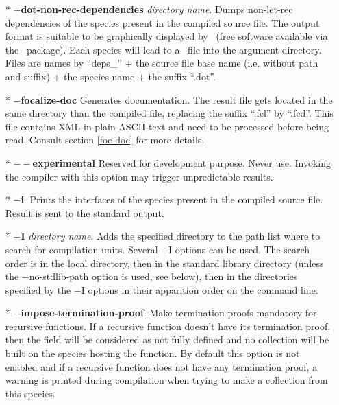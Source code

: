 \begin{itemize}
  \item[*] {\bf $-$dot-non-rec-dependencies} {\em directory name}.
    Dumps non-let-rec dependencies of the species present in the
    compiled source file. The output format is suitable to be
    graphically displayed by \dotty\ (free software available via the
    \graphviz\ package). Each species will lead to a \dotty\ file into
    the argument directory. Files are names by ``deps\_'' + the source
    file base name (i.e. without path and suffix) + the species name +
    the suffix ``.dot''.

  \item[*] {\bf $-$focalize-doc} Generates documentation. The
    result file gets located in the same directory than the compiled
    file, replacing the suffix ``.fcl'' by ``.fcd''. This file contains
    XML in plain ASCII text and need to be processed before being read.
    Consult section \ref{foc-doc} for more details.

  \item[*] {\bf $--$experimental} Reserved for development purpose.
    Never use. Invoking the compiler with this option may trigger
    unpredictable results.

  \item[*] {\bf $-$i}. Prints the interfaces of the species present in
    the compiled source file. Result is sent to the standard output.

  \item[*] {\bf $-$I} {\em directory name}. Adds the specified
    directory to the path list where to search for
    compilation units. Several $-$I options can be used. The search order is
    in the local directory, then in the standard library directory (unless the
    $-$no-stdlib-path option is used, see below), then in the
    directories specified by the $-$I options in their apparition
    order on the command line.

  \item[*] {\bf $-$impose-termination-proof}. Make termination proofs
    mandatory for recursive functions. If a recursive function doesn't
    have its termination proof, then the field will be considered as
    not fully defined and no collection will be built on the
    species hosting the function. By default this option is not
    enabled and if a recursive function does not have any termination
    proof, a warning is printed during compilation when trying to make
    a collection from this species.


\end{itemize}
